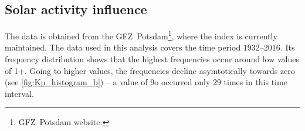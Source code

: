 \subsection{Solar activity influence}
The \Kp{} data is obtained from the GFZ~Potsdam\footnote{GFZ~Potsdam website: }, where the index is currently maintained. The data used in this analysis covers the time period 1932--2016. Its frequency distribution shows that the highest frequencies occur around low \Kp{} values of 1+. Going to higher \Kp{} values, the frequencies decline asymtotically towards zero (see \autoref{fig:Kp_histogram_b}) -- a \Kp{} value of 9o occurred only 29 times in this time interval.\\
\begin{figure}[htb]
	\begin{floatrow}
\end{floatrow}
\end{figure}

